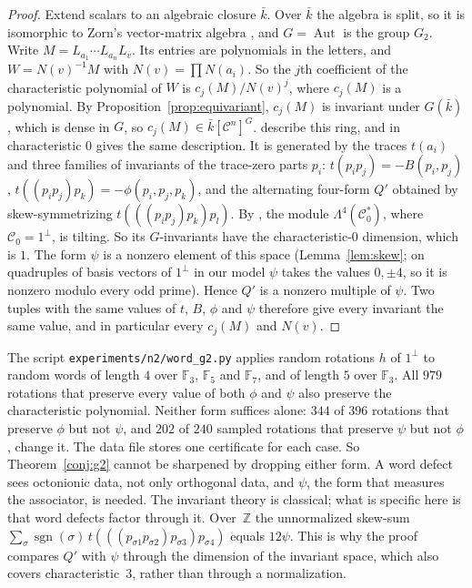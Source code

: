 \documentclass[11pt]{amsart}
\theoremstyle{definition}
\theoremstyle{remark}
\newcommand{\F}{\mathbb{F}}
\newcommand{\C}{\mathcal{C}}
\newcommand{\conj}[1]{\overline{#1}}
\begin{document}
\begin{proof}
Extend scalars to an algebraic closure $\bar k$. Over $\bar k$ the algebra is
split, so it is isomorphic to Zorn's vector-matrix algebra
\cite[Ch.~1]{springer2000}, and $G=\operatorname{Aut}$ is the group $G_2$.
Write $M=L_{a_1}\cdots L_{a_n}L_{\conj v}$. Its entries are polynomials in the
letters, and $W=N(v)^{-1}M$ with $N(v)=\prod N(a_i)$. So the $j$th coefficient
of the characteristic polynomial of $W$ is $c_j(M)/N(v)^j$, where $c_j(M)$ is a
polynomial. By Proposition~\ref{prop:equivariant}, $c_j(M)$ is invariant
under $G(\bar k)$, which is dense in $G$, so $c_j(M)\in\bar k[\C^n]^G$.
\cite[Cor.~7.11 and the remark after it]{zubkov-shestakov} describe this ring,
and in characteristic $0$ \cite{schwarz1988} gives the same description. It is
generated by the traces $t(a_i)$ and three families of invariants of the
trace-zero parts $p_i$: $t(p_ip_j)=-B(p_i,p_j)$, $t((p_ip_j)p_k)=-\phi(p_i,p_j,p_k)$,
and the alternating four-form $Q'$ obtained by skew-symmetrizing
$t(((p_ip_j)p_k)p_l)$.
By \cite[Prop.~3.2]{zubkov-shestakov}, the module $\Lambda^4(\C_0^*)$, where
$\C_0=1^\perp$, is tilting. So its $G$-invariants have the characteristic-$0$
dimension, which is $1$. The form $\psi$ is a nonzero element of this space
(Lemma~\ref{lem:skew}; on quadruples of basis vectors of $1^\perp$ in our
model $\psi$ takes the values $0,\pm4$, so it is nonzero modulo every odd
prime). Hence $Q'$ is a nonzero multiple of
$\psi$. Two tuples with the same values of $t$, $B$, $\phi$ and $\psi$
therefore give every invariant the same value, and in particular every
$c_j(M)$ and $N(v)$.
\end{proof}

The script \texttt{experiments/n2/word\_g2.py} applies random rotations $h$ of
$1^\perp$ to random words of length $4$ over $\F_3$, $\F_5$ and $\F_7$, and of
length $5$ over $\F_3$. All $979$ rotations that preserve every value of both
$\phi$ and $\psi$ also preserve the characteristic polynomial. Neither form
suffices alone: $344$ of $396$ rotations that preserve $\phi$ but not $\psi$,
and $202$ of $240$ sampled rotations that preserve $\psi$ but not $\phi$,
change it. The data file stores one certificate for each case. So
Theorem~\ref{conj:g2} cannot be sharpened by dropping either form. A word
defect sees octonionic data, not only orthogonal data, and $\psi$, the form
that measures the associator, is needed. The invariant theory is classical;
what is specific here is that word defects factor through it. Over~$\mathbb{Z}$
the unnormalized skew-sum
$\sum_\sigma\operatorname{sgn}(\sigma)\,t(((p_{\sigma1}p_{\sigma2})p_{\sigma3})p_{\sigma4})$
equals $12\psi$. This is why the proof compares $Q'$ with $\psi$ through the
dimension of the invariant space, which also covers characteristic~$3$,
rather than through a normalization.
\end{document}
